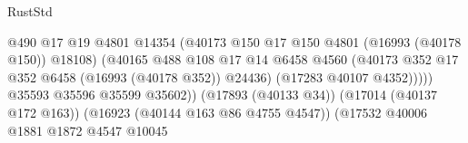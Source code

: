 \begin{lexlean}{RustStd}
\begin{coremodule}
{\begin{coremodule}
{{{{{{{{{{{{{{{{{{{{{{{{{{{{{{{{{{{{{{{{{{{{{{{{{{{{{{{                                                          @490
                                                          @17
                                                          @19
                                                          @4801
                                                          @14354
                                                          (@40173
                                                            @150
                                                            @17
                                                            @150
                                                            @4801
                                                            (@16993 (@40178 @150))
                                                            @18108)
                                                          (@40165
                                                            @488
                                                            @108
                                                            @17
                                                            @14
                                                            @6458
                                                            @4560
                                                            (@40173
                                                              @352
                                                              @17
                                                              @352
                                                              @6458
                                                              (@16993 (@40178 @352))
                                                              @24436)
                                                            (@17283 @40107 @4352)))))
                                                    @35593
                                                    @35596
                                                    @35599
                                                    @35602))
                                                (@17893 (@40133 @34))
                                                (@17014 (@40137 @172 @163))
                                                (@16923 (@40144 @163 @86 @4755 @4547))
                                                (@17532
                                                  @40006
                                                  @1881
                                                  @1872
                                                  @4547
                                                  @10045
}}}}}}}}}}}}}}}}}}}}}}}}}}}}}}}}}}}}}}}}}}}}}}}}}}}}}}}
\end{coremodule}}
\end{coremodule}
\end{lexlean}
